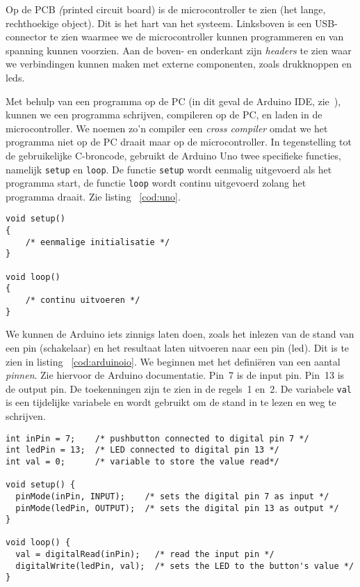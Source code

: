 Op de PCB \textsl(printed circuit board) is de microcontroller te zien (het lange, rechthoekige object). Dit is het hart van het systeem. Linksboven is een USB-connector te zien waarmee we de microcontroller kunnen programmeren en van spanning kunnen voorzien. Aan de boven- en onderkant zijn \textsl{headers} te zien waar we verbindingen kunnen maken met externe componenten, zoals drukknoppen en leds.

Met behulp van een programma op de PC (in dit geval de Arduino IDE, zie~\cite{arduino}), kunnen we een programma schrijven, compileren op de PC, en laden in de microcontroller. We noemen zo'n compiler een \textsl{cross compiler} omdat we het programma niet op de PC draait maar op de microcontroller. In tegenstelling tot de gebruikelijke C-broncode, gebruikt de Arduino Uno twee specifieke functies, namelijk \lstinline|setup| en \lstinline|loop|. De functie \lstinline|setup| wordt eenmalig uitgevoerd als het programma start, de functie \lstinline|loop| wordt continu uitgevoerd zolang het programma draait. Zie listing~ \ref{cod:uno}.

\begin{lstlisting}[caption=Uitvoering op een Adruino Uno.,label=cod:uno]
void setup()
{
    /* eenmalige initialisatie */
}

void loop()
{
    /* continu uitvoeren */
}
\end{lstlisting}

We kunnen de Arduino iets zinnigs laten doen, zoals het inlezen van de stand van een pin (schakelaar) en het resultaat laten uitvoeren naar een pin (led). Dit is te zien in listing~ \ref{cod:arduinoio}. We beginnen met het defini\"eren van een aantal \textsl{pinnen}. Zie hiervoor de Arduino documentatie. Pin~7 is de input pin. Pin~13 is de output pin. De toekenningen zijn te zien in de regels~1 en~2. De variabele \lstinline|val| is een tijdelijke variabele en wordt gebruikt om de stand in te lezen en weg te schrijven.

\begin{lstlisting}[caption={Inlezen van een pin en het resultaat schrijven naar een pin.},label=cod:arduinoio]
int inPin = 7;    /* pushbutton connected to digital pin 7 */
int ledPin = 13;  /* LED connected to digital pin 13 */
int val = 0;      /* variable to store the value read*/

void setup() {
  pinMode(inPin, INPUT);    /* sets the digital pin 7 as input */
  pinMode(ledPin, OUTPUT);  /* sets the digital pin 13 as output */
}

void loop() {
  val = digitalRead(inPin);   /* read the input pin */
  digitalWrite(ledPin, val);  /* sets the LED to the button's value */
}
\end{lstlisting}

